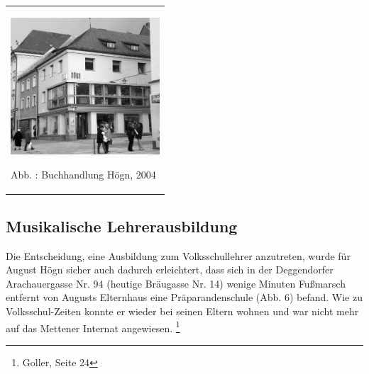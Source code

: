 \documentclass[a4paper]{article}
\newcounter{Abb}
\renewcommand\theAbb{\arabic{Abb}}
\begin{document}
\begin{center}
\begin{minipage}{5.95cm}
\begin{flushleft}
\tablefirsthead{}
\tablehead{}
\tabletail{}
\tablelasttail{}
\begin{supertabular}{m{5.75cm}}

\includegraphics[width=5.567cm,height=5.131cm]{pictures/zulassungsarbeit-img007.jpg}

\label{bkm:Ref100297337}Abb. \stepcounter{Abb}{\theAbb}: Buchhandlung
Högn, 2004\\
\end{supertabular}
\end{flushleft}
\end{minipage}
\end{center}
\subsection{Musikalische Lehrerausbildung}
\hypertarget{RefHeadingToc100333727}{}Die Entscheidung, eine Ausbildung
zum Volksschullehrer anzutreten, wurde für August Högn sicher auch
dadurch erleichtert, dass sich in der Deggendorfer Arachauergasse Nr.
94 (heutige Bräugasse Nr. 14) wenige Minuten Fußmarsch entfernt von
Augusts Elternhaus eine Präparandenschule (Abb. 6) befand. Wie zu
Volksschul-Zeiten konnte er wieder bei seinen Eltern wohnen und war
nicht mehr auf das Mettener Internat angewiesen. \footnote{Goller,
Seite 24}
\end{document}
